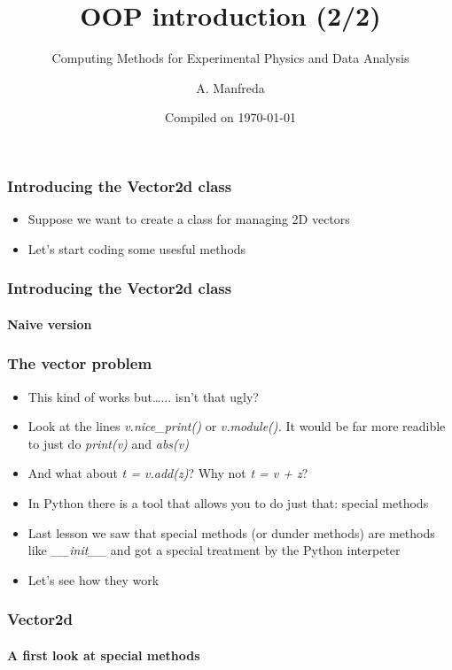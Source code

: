 \documentclass[9pt]{beamer}
\title{OOP introduction (2/2)}
\subtitle{Computing Methods for Experimental Physics and Data Analysis}
\date{Compiled on \today}
\author{A. Manfreda}
\institute[INFN]{INFN--Pisa}
\begin{document}
\titleframe


\begin{frame}
  \frametitle{Introducing the Vector2d class}
  
  \begin{itemize}
    \item Suppose we want to create a class for managing 2D vectors
    \bigskip
    \item Let's start coding some usesful methods
  \end{itemize}
  
\end{frame}


\begin{frame}
  \frametitle{Introducing the Vector2d class}
  \framesubtitle{Naive version}
  
\end{frame}


\begin{frame}
  \frametitle{The vector problem}
  
  \begin{itemize}
    \item This kind of works but\dots... isn't that ugly?
    \medskip
    \item Look at the lines \emph{v.nice\_print()} or \emph{v.module().}
          It would be far more readible to just do \emph{print(v)} and \emph{abs(v)}
    \medskip
    \item And what about \emph{t = v.add(z)}? Why not \emph{t = v + z}?
    \medskip
    \item In Python there is a tool that allows you to do just that: \alert{special methods}
    \medskip
    \item Last lesson we saw that special methods (or dunder methods) are
          methods like \emph{\_\_init\_\_} and got a special treatment 
          by the Python interpeter
    \medskip
    \item Let's see how they work
  \end{itemize}
  
\end{frame}

  
\begin{frame}
  \frametitle{Vector2d}
  \framesubtitle{A first look at special methods}
  
\end{frame}
\end{document}
